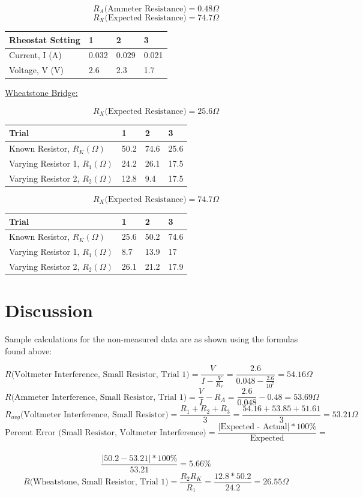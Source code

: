\documentclass[11pt, titlepage]{article}
\begin{document}
\begin{center}
$$R_A \text{(Ammeter Resistance)}= 0.48 \Omega$$
$$R_X \text{(Expected Resistance)}= 74.7 \Omega$$
\begin{tabular}
{|m{9em}|m{7em}|m{7em}|m{7em}|}
\hline
Rheostat Setting & 1 & 2 & 3 \\
\hline
Current, I (A) & 0.032 & 0.029 & 0.021 \\
\hline
Voltage, V (V) & 2.6 & 2.3 & 1.7 \\
\hline
\end{tabular}
\end{center}

\underline{Wheatstone Bridge:}
\begin{center}
$$R_X \text{(Expected Resistance)}= 25.6 \Omega$$
\begin{tabular}
{|m{9em}|m{7em}|m{7em}|m{7em}|}
\hline
Trial & 1 & 2 & 3 \\
\hline
Known Resistor, $R_K (\Omega)$ & 50.2 & 74.6 & 25.6 \\
\hline
Varying Resistor 1, $R_1 (\Omega)$ & 24.2 & 26.1 & 17.5 \\
\hline
Varying Resistor 2, $R_2 (\Omega)$ & 12.8 & 9.4 & 17.5 \\
\hline
\end{tabular}
\end{center}

\begin{center}
$$R_X \text{(Expected Resistance)}= 74.7 \Omega$$
\begin{tabular}
{|m{9em}|m{7em}|m{7em}|m{7em}|}
\hline
Trial & 1 & 2 & 3 \\
\hline
Known Resistor, $R_K (\Omega)$ & 25.6 & 50.2 & 74.6 \\
\hline
Varying Resistor 1, $R_1 (\Omega)$ & 8.7 & 13.9 & 17 \\
\hline
Varying Resistor 2, $R_2 (\Omega)$ & 26.1 & 21.2 & 17.9 \\
\hline
\end{tabular}
\end{center}

\section*{Discussion}
Sample calculations for the non-measured data are as shown using the formulas found above:

$$R \text{(Voltmeter Interference, Small Resistor, Trial 1)} = \frac{V}{I - \frac{V}{R_V}} = \frac{2.6}{0.048 - \frac{2.6}{10^7}} = 54.16 \Omega$$
$$R \text{(Ammeter Interference, Small Resistor, Trial 1)} = \frac{V}{I} - R_A = \frac{2.6}{0.048} - 0.48 = 53.69 \Omega$$
$$R_{avg} \text{(Voltmeter Interference, Small Resistor)} = \frac{R_1 + R_2 + R_3}{3} = \frac{54.16 + 53.85 + 51.61}{3} = 53.21 \Omega$$
$$\text{Percent Error (Small Resistor, Voltmeter Interference)} = \frac{\text{$|$Expected - Actual$|$} * 100\%}{\text{Expected}} =$$\\$$\frac{|50.2 - 53.21| * 100\%}{53.21} = 5.66\%$$
$$R \text{(Wheatstone, Small Resistor, Trial 1)} = \frac{R_2R_K}{R_1} = \frac{12.8*50.2}{24.2} = 26.55 \Omega$$
\end{document}
